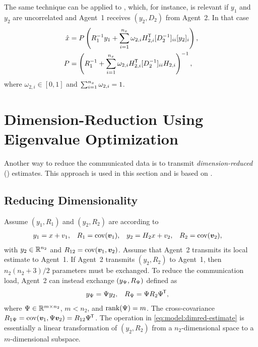 The same technique can be applied to \abbrKF, which, for instance, is relevant if $y_1$ and $y_2$ are uncorrelated and Agent~1 receives $(y_2,D_2)$ from Agent~2. In that case
\begin{subequations} \label{eq:dca-hyp:kf}
\begin{align}
	\hat{x} &= P\left(R_1^{-1} y_1 + \sum_{i=1}^{n_x} \omega_{2,i} H_{2,i}^{\mkern-1.5mu\mathsf{T}} [D_2^{-1}]_{ii}[y_2]_i \right), \\
	P &= \left(R_1^{-1} + \sum_{i=1}^{n_x} \omega_{2,i} H_{2,i}^{\mkern-1.5mu\mathsf{T}} [D_2^{-1}]_{ii}H_{2,i} \right)^{-1},
\end{align}
\end{subequations}
where $\omega_{2,i}\in[0,1]$ and $\sum_{i=1}^{n_x}\omega_{2,i}=1$.







\section{Dimension-Reduction Using Eigenvalue Optimization}

Another way to reduce the communicated data is to transmit \emph{dimension-reduced} (\abbrDR) estimates. This approach is used in this section and is based on \cite[Chapter~5]{Forsling2023Phd}.


\subsection{Reducing Dimensionality}

Assume $(y_1,R_1)$ and $(y_2,R_2)$ are according to
\begin{align}
	y_1 &= x+v_1, & R_1 &= \operatorname*{\rm cov}(\bm{v}_1), &
	y_2 &= H_2x+v_2, & R_2 &= \operatorname*{\rm cov}(\bm{v}_2),
	\label{eq:model:dr:two-estimates}
\end{align}
with $y_2\in{\mathbb{R}}^{n_2}$ and $R_{12}=\operatorname*{\rm cov}(\bm{v}_1,\bm{v}_2)$. Assume \wolog that Agent~2 transmits its local estimate to Agent~1. If Agent~2 transmits $(y_2,R_2)$ to Agent~1, then $n_2(n_2+3)/2$ parameters must be exchanged. To reduce the communication load, Agent~2 can instead exchange $(y_\Psi,R_\Psi)$ defined as
\begin{align}
	y_\Psi &= \Psi y_2, & R_\Psi &= \Psi R_2\Psi^{\mkern-1.5mu\mathsf{T}},
	\label{eq:model:dimred-estimate}
\end{align} 
where $\Psi\in{\mathbb{R}}^{m\times n_2}$, $m<n_2$, and $\operatorname*{\rm rank}(\Psi)=m$. The cross-covariance $R_{1\Psi}=\operatorname*{\rm cov}(\bm{v}_1,\Psi\bm{v}_2)=R_{12}\Psi^{\mkern-1.5mu\mathsf{T}}$. The operation in \eqref{eq:model:dimred-estimate} is essentially a linear transformation of $(y_2,R_2)$ from a $n_2$-dimensional space to a $m$-dimensional subspace. 


